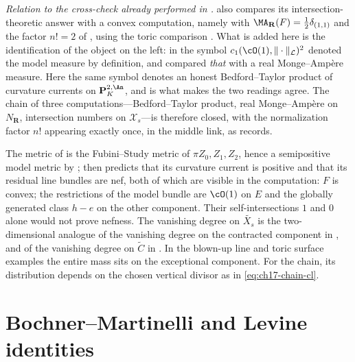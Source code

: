 \begin{example}
\emph{Relation to the cross-check already performed in
.}   also compares its
intersection-theoretic answer with a convex computation, namely with
$\MA_{\mathbf R}(F)=\tfrac12\delta_{(1,1)}$ and the factor $n!=2$ of
, using the toric comparison
.  What is added here is the identification of
the object on the left: in  the symbol
$c_1(\cO(1),\|\cdot\|_{\mathcal L})^2$ denoted the model measure by
definition, and  compared \emph{that} with a
real Monge--Amp\`ere measure.  Here the same symbol denotes an honest
Bedford--Taylor product of curvature currents on
$\mathbf P^{2,\An}_K$, and  is what makes the two
readings agree.  The chain of three computations---Bedford--Taylor product,
real Monge--Amp\`ere on $N_{\mathbf R}$, intersection numbers on
$\mathcal X_s$---is therefore closed, with the normalization factor
$n!$ appearing exactly once, in the middle link, as
 records.
\end{example}

\begin{remark}
\label{rem:ch17-fs-check}
The metric of  is the Fubini--Study metric
of $\pi Z_0,Z_1,Z_2$, hence a semipositive model metric by
;  then predicts
that its curvature current is positive and that its residual line bundles
are nef, both of which are visible in the computation:
$F$ is convex; the restrictions of the model bundle are $\cO(1)$ on
$E$ and the globally generated class $h-e$ on the other component.
Their self-intersections $1$ and $0$ alone would not prove nefness.  The vanishing degree on $\widetilde{X_s}$ is the
two-dimensional analogue of the vanishing degree on the contracted component
in , and of the vanishing degree on
$\widetilde C$ in .  In the blown-up line and toric surface examples the entire mass sits
on the exceptional component.  For the chain, its distribution depends
on the chosen vertical divisor as in \eqref{eq:ch17-chain-cl}.
\end{remark}

\section{Bochner--Martinelli and Levine identities}
\label{sec:ch17-bm-levine}

